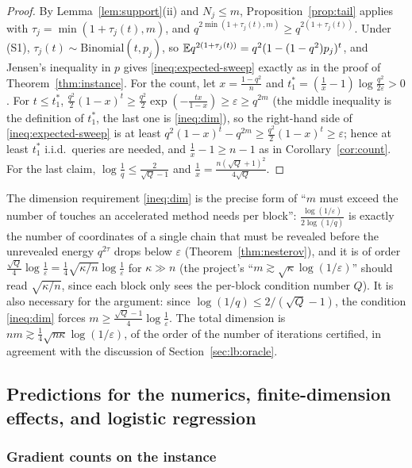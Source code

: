 \begin{proof}
By Lemma~\ref{lem:support}(ii) and $N_j\le m$, Proposition~\ref{prop:tail} applies with $\tau_j=\min(1+\tau_j(t),m)$, and $q^{2\min(1+\tau_j(t),m)}\ge q^{2(1+\tau_j(t))}$. Under (S1), $\tau_j(t)\sim\mathrm{Binomial}(t,p_j)$, so $\mathbb{E} q^{2(1+\tau_j(t))}=q^2(1-(1-q^2)p_j)^t$, and Jensen's inequality in $p$ gives \eqref{ineq:expected-sweep} exactly as in the proof of Theorem~\ref{thm:instance}. For the count, let $x=\frac{1-q^2}n$ and $t^\ast_1=(\frac1x-1)\log\frac{q^2}{2\varepsilon}>0$. For $t\le t^\ast_1$, $\frac{q^2}2(1-x)^t\ge\frac{q^2}2\exp(-\frac{tx}{1-x})\ge\varepsilon\ge q^{2m}$ (the middle inequality is the definition of $t^\ast_1$, the last one is \eqref{ineq:dim}), so the right-hand side of \eqref{ineq:expected-sweep} is at least $q^2(1-x)^t-q^{2m}\ge\frac{q^2}2(1-x)^t\ge\varepsilon$; hence at least $t^\ast_1$ i.i.d.\ queries are needed, and $\frac1x-1\ge n-1$ as in Corollary~\ref{cor:count}. For the last claim, $\log\frac1q\le\frac2{\sqrt Q-1}$ and $\frac1x=\frac{n(\sqrt Q+1)^2}{4\sqrt Q}$.
\end{proof}

The dimension requirement \eqref{ineq:dim} is the precise form of ``$m$ must exceed the number of touches an accelerated method needs per block'': $\frac{\log(1/\varepsilon)}{2\log(1/q)}$ is exactly the number of coordinates of a single chain that must be revealed before the unrevealed energy $q^{2\tau}$ drops below $\varepsilon$ (Theorem~\ref{thm:nesterov}), and it is of order $\frac{\sqrt Q}4\log\frac1\varepsilon=\frac14\sqrt{\kappa/n}\log\frac1\varepsilon$ for $\kappa\gg n$ (the project's ``$m\gtrsim\sqrt\kappa\log(1/\varepsilon)$'' should read $\sqrt{\kappa/n}$, since each block only sees the per-block condition number $Q$). It is also necessary for the argument: since $\log(1/q)\le2/(\sqrt Q-1)$, the condition \eqref{ineq:dim} forces $m\ge\frac{\sqrt Q-1}4\log\frac1\varepsilon$. The total dimension is $nm\gtrsim\frac14\sqrt{n\kappa}\log(1/\varepsilon)$, of the order of the number of iterations certified, in agreement with the discussion of Section~\ref{sec:lb:oracle}.
\subsection{Predictions for the numerics, finite-dimension effects, and logistic regression}
\label{sec:lb:predictions}

\subsubsection{Gradient counts on the instance}


